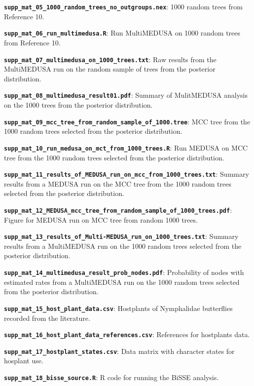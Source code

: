 \documentclass[]{article}
\begin{document}
\textbf{\texttt{supp\_mat\_05\_1000\_random\_trees\_no\_outgroups.nex}}:
1000 random trees from Reference 10.

\textbf{\texttt{supp\_mat\_06\_run\_multimedusa.R}}: Run MultiMEDUSA on
1000 random trees from Reference 10.

\textbf{\texttt{supp\_mat\_07\_multimedusa\_on\_1000\_trees.txt}}: Raw
results from the MultiMEDUSA run on the random sample of trees from the
posterior distribution.

\textbf{\texttt{supp\_mat\_08\_multimedusa\_result01.pdf}}: Summary of
MulitMEDUSA analysis on the 1000 trees from the posterior distribution.

\textbf{\texttt{supp\_mat\_09\_mcc\_tree\_from\_random\_sample\_of\_1000.tree}}:
MCC tree from the 1000 random trees selected from the posterior
distribution.

\textbf{\texttt{supp\_mat\_10\_run\_medusa\_on\_mct\_from\_1000\_trees.R}}:
Run MEDUSA on MCC tree from the 1000 random trees selected from the
posterior distribution.

\textbf{\texttt{supp\_mat\_11\_results\_of\_MEDUSA\_run\_on\_mcc\_from\_1000\_trees.txt}}:
Summary results from a MEDUSA run on the MCC tree from the 1000 random
trees selected from the posterior distribution.

\textbf{\texttt{supp\_mat\_12\_MEDUSA\_mcc\_tree\_from\_random\_sample\_of\_1000\_trees.pdf}}:
Figure for MEDUSA run on MCC tree from random 1000 trees.

\textbf{\texttt{supp\_mat\_13\_results\_of\_Multi-MEDUSA\_run\_on\_1000\_trees.txt}}:
Summary results from a MultiMEDUSA run on the 1000 random trees selected
from the posterior distribution.

\textbf{\texttt{supp\_mat\_14\_multimedusa\_result\_prob\_nodes.pdf}}:
Probability of nodes with estimated rates from a MultiMEDUSA run on the
1000 random trees selected from the posterior distribution.

\textbf{\texttt{supp\_mat\_15\_host\_plant\_data.csv}}: Hostplants of
Nymphalidae butterflies recorded from the literature.

\textbf{\texttt{supp\_mat\_16\_host\_plant\_data\_references.csv}}:
References for hostplants data.

\textbf{\texttt{supp\_mat\_17\_hostplant\_states.csv}}: Data matrix with
character states for hosplant use.

\textbf{\texttt{supp\_mat\_18\_bisse\_source.R}}: R code for running the
BiSSE analysis.
\end{document}
